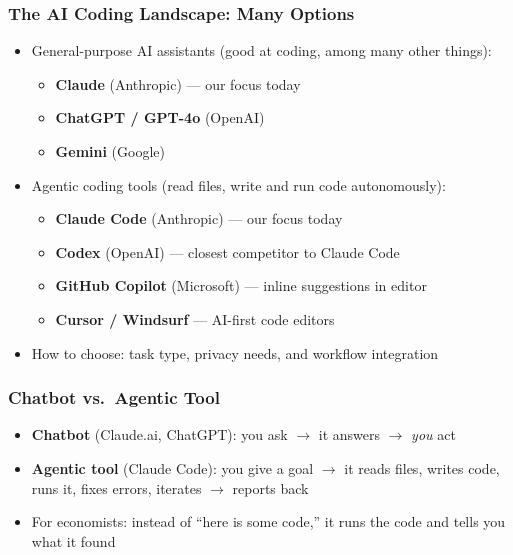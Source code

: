 \documentclass[aspectratio=169, 12pt]{beamer}
\begin{document}
\begin{frame}
\frametitle{The AI Coding Landscape: Many Options}

\begin{itemize}
    \item General-purpose AI assistants (good at coding, among many other things):
        \begin{itemize}
            \item[$\circ$] \textbf{Claude} (Anthropic) --- our focus today
            \item[$\circ$] \textbf{ChatGPT / GPT-4o} (OpenAI)
            \item[$\circ$] \textbf{Gemini} (Google)
        \end{itemize}
    \vspace{.05in}
    \item Agentic coding tools (read files, write and run code autonomously):
        \begin{itemize}
            \item[$\circ$] \textbf{Claude Code} (Anthropic) --- our focus today
            \item[$\circ$] \textbf{Codex} (OpenAI) --- closest competitor to Claude Code
            \item[$\circ$] \textbf{GitHub Copilot} (Microsoft) --- inline suggestions in editor
            \item[$\circ$] \textbf{Cursor / Windsurf} --- AI-first code editors
        \end{itemize}
    \vspace{.05in}
    \item How to choose: task type, privacy needs, and workflow integration
\end{itemize}

\end{frame}


\begin{frame}
\frametitle{Chatbot vs.\ Agentic Tool}

\begin{itemize}
    \item \textbf{Chatbot} (Claude.ai, ChatGPT): you ask $\to$ it answers $\to$ \textit{you} act
    \vspace{.05in}
    \item \textbf{Agentic tool} (Claude Code): you give a goal $\to$ it reads files, writes code, runs it, fixes errors, iterates $\to$ reports back
    \vspace{.1in}
    \item For economists: instead of ``here is some code,'' it runs the code and tells you what it found
\end{itemize}

\end{frame}
\end{document}
